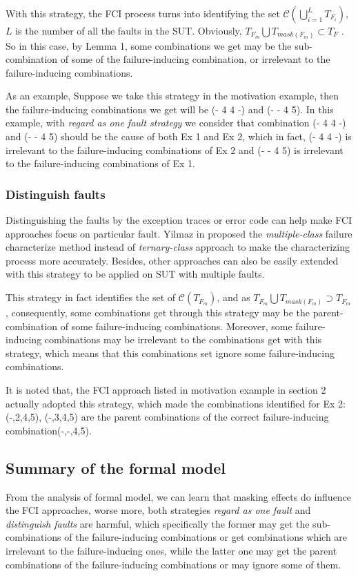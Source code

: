 \documentclass{sig-alternate}
\begin{document}
With this strategy, the FCI process turns into identifying the set $\mathcal{C}(\bigcup_{i = 1}^{L}T_{F_{i}})$, $L$ is the number of all the faults in the SUT. Obviously, $T_{F_{m}} \bigcup T_{mask(F_{m})} \subset T_{F}$ . So in this case, by Lemma 1, some combinations we get may be the sub-combination of some of the failure-inducing combination, or irrelevant to the failure-inducing combinations.

As an example, Suppose we take this strategy in the motivation example, then the failure-inducing combinations we get will be (- 4 4 -) and (- - 4 5). In this example, with \emph{regard as one fault strategy} we consider that combination (- 4 4 -) and (- - 4 5) should be the cause of both Ex 1 and Ex 2, which in fact, (- 4 4 -) is irrelevant to the failure-inducing combinations of Ex 2 and (- - 4 5) is irrelevant to the failure-inducing combinations of Ex 1.

\subsubsection{Distinguish faults}
Distinguishing the faults by the exception traces or error code can help make FCI approaches focus on particular fault. Yilmaz in  \cite{yilmaz2013reducing} proposed the \emph{multiple-class} failure characterize method instead of \emph{ternary-class} approach to make the characterizing process more accurately. Besides, other approaches can also be easily extended with this strategy to be applied on SUT with multiple faults.

This strategy in fact identifies the set of $\mathcal{C}(T_{F_{m}})$, and as $T_{F_{m}} \bigcup T_{mask(F_{m})} \supset T_{F_{m}} $, consequently, some combinations get through this strategy may be the parent-combination of some failure-inducing combinations. Moreover, some failure-inducing combinations may be irrelevant to the combinations get with this strategy, which means that this combinations set ignore some failure-inducing combinations.

It is noted that, the FCI approach listed in motivation example in section 2 actually adopted this strategy, which made the combinations identified for Ex 2: (-,2,4,5), (-,3,4,5) are the parent combinations of the correct failure-inducing combination(-,-,4,5).

\subsection{Summary of the formal model}
From the analysis of formal model, we can learn that masking effects do influence the FCI approaches, worse more, both strategies \emph{regard as one fault} and \emph{distinguish faults} are harmful, which specifically the former may get the sub-combinations of the failure-inducing combinations or get combinations which are irrelevant to the failure-inducing ones, while the latter one may get the parent combinations of the failure-inducing combinations or may ignore some of them.
\end{document}
